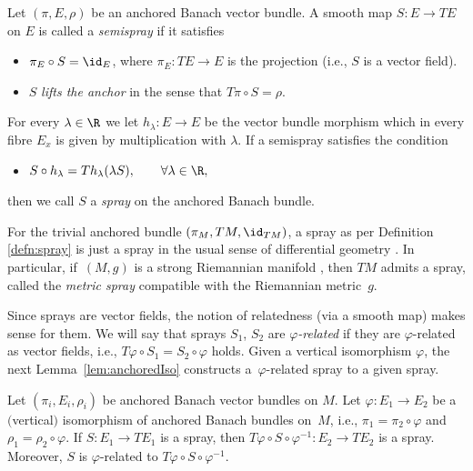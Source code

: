 \begin{Definition}\label{defn:spray}
Let $(\pi, E, \rho)$ be an anchored Banach vector bundle.
A smooth map $S\colon E \rightarrow TE$ on $E$ is called a \emph{semispray} if it satisfies
\begin{itemize}\itemsep=0pt
\item[\hypertarget{sprayS1}{(S1)}] $\pi_{E} \circ S = \id_E$, where $\pi_E \colon TE\rightarrow E$ is the projection (i.e., $S$ is a vector field).
\item[\hypertarget{sprayS2}{(S2)}] $S$ \emph{lifts the anchor} in the sense that $T\pi \circ S = \rho$.
\end{itemize}
For every $\lambda \in \R$ we let $h_\lambda \colon E \rightarrow E$ be the vector bundle morphism which in every fibre $E_x$ is given by multiplication with $\lambda$.
If a semispray satisfies the condition
\begin{itemize}\itemsep=0pt
\item[\hypertarget{sprayS3}{(S3)}] $S\circ h_\lambda = Th_\lambda (\lambda S), \qquad \forall \lambda \in \R,$
\end{itemize}
then we call $S$ a \emph{spray} on the anchored Banach bundle.
\end{Definition}

\begin{Example}
For the trivial anchored bundle $(\pi_M, TM,\id_{TM})$, a spray as per Definition \ref{defn:spray} is just a spray in the usual sense of differential geometry \cite[Chapter~IV, Section~3]{La01}.
In particular, if~$(M,g)$ is a strong Riemannian manifold \cite[Section~4]{Sch23}, then $TM$ admits a spray, called the \emph{metric spray} compatible with the Riemannian metric~$g$.
\end{Example}

Since sprays are vector fields, the notion of relatedness (via a smooth map) makes sense for them. We will say that sprays $S_1$, $S_2$ are $\varphi$\emph{-related} if they are $\varphi$-related as vector fields, i.e., $T\varphi \circ S_1 = S_2 \circ \varphi$ holds.
Given a vertical isomorphism $\varphi$, the next Lemma~\ref{lem:anchoredIso} constructs a~$\varphi$-related spray to a given spray.

\begin{Lemma}\label{lem:anchoredIso}
 Let $(\pi_{i},E_{i},\rho_{i})$ be anchored Banach vector bundles on $M$.
 Let $\varphi \colon E_{1} \rightarrow E_{2}$ be a~$($vertical$)$ isomorphism of anchored Banach bundles on~$M$, i.e., $\pi_{1} = \pi_{2}\circ \varphi$ and $\rho_{1} = \rho_{2} \circ \varphi$.
 If $S\colon E_{1} \rightarrow TE_{1}$ is a spray, then $T\varphi \circ S \circ \varphi^{-1}\colon E_{2} \rightarrow TE_{2}$ is a spray.
 Moreover, $S$ is $\varphi$-related to $T \varphi \circ S \circ \varphi^{-1}$.
\end{Lemma}

